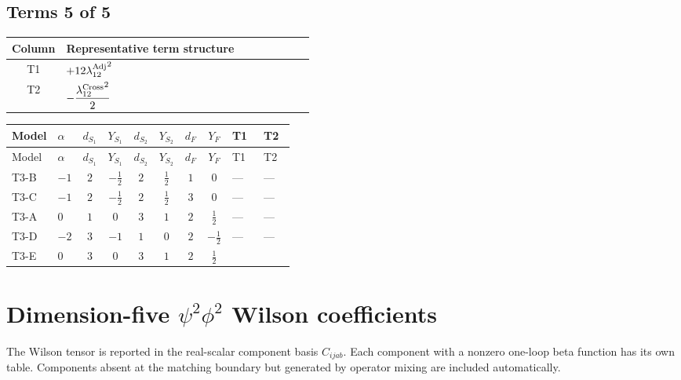 \documentclass[8pt]{article}
\begin{document}
\begin{landscape}
\subsection*{Terms 5 of 5}
\begin{center}
\begin{tabular}{@{}c >{\raggedright\arraybackslash}p{0.82\linewidth}@{}}
\toprule
Column & Representative term structure \\
\midrule
T1 & \(\displaystyle +12 {\lambda_{12}^{\rm Adj}}^2\) \\
\midrule
T2 & \(\displaystyle -\frac{{\lambda_{12}^{\rm Cross}}^2}{2}\) \\
\midrule
\bottomrule
\end{tabular}
\end{center}
\smallskip
\tiny
\begin{longtable}{@{}llcccccc >{\raggedright\arraybackslash}p{0.21\linewidth} >{\raggedright\arraybackslash}p{0.21\linewidth}@{}}
\toprule
Model & $\alpha$ & $d_{S_1}$ & $Y_{S_1}$ & $d_{S_2}$ & $Y_{S_2}$ & $d_F$ & $Y_F$ & T1 & T2 \\
\midrule
\endfirsthead
\toprule
Model & $\alpha$ & $d_{S_1}$ & $Y_{S_1}$ & $d_{S_2}$ & $Y_{S_2}$ & $d_F$ & $Y_F$ & T1 & T2 \\
\midrule
\endhead
T3-B & $-1$ & $2$ & $-\frac{1}{2}$ & $2$ & $\frac{1}{2}$ & $1$ & $0$ & --- & --- \\
\midrule
T3-C & $-1$ & $2$ & $-\frac{1}{2}$ & $2$ & $\frac{1}{2}$ & $3$ & $0$ & --- & --- \\
\midrule
T3-A & $0$ & $1$ & $0$ & $3$ & $1$ & $2$ & $\frac{1}{2}$ & --- & --- \\
\midrule
T3-D & $-2$ & $3$ & $-1$ & $1$ & $0$ & $2$ & $-\frac{1}{2}$ & --- & --- \\
\midrule
T3-E & $0$ & $3$ & $0$ & $3$ & $1$ & $2$ & $\frac{1}{2}$ & \scriptsize\adjustbox{max width=\linewidth}{$\begin{gathered} +12 {\lambda_{12}^{\rm Adj}}^2\end{gathered}$} & \scriptsize\adjustbox{max width=\linewidth}{$\begin{gathered} -\frac{{\lambda_{12}^{\rm Cross}}^2}{2}\end{gathered}$} \\
\midrule
\bottomrule
\end{longtable}
\clearpage
\section*{Dimension-five $\psi^2\phi^2$ Wilson coefficients}
The Wilson tensor is reported in the real-scalar component basis $C_{ijab}$. Each component with a nonzero one-loop beta function has its own table. Components absent at the matching boundary but generated by operator mixing are included automatically.

\end{landscape}
\end{document}
